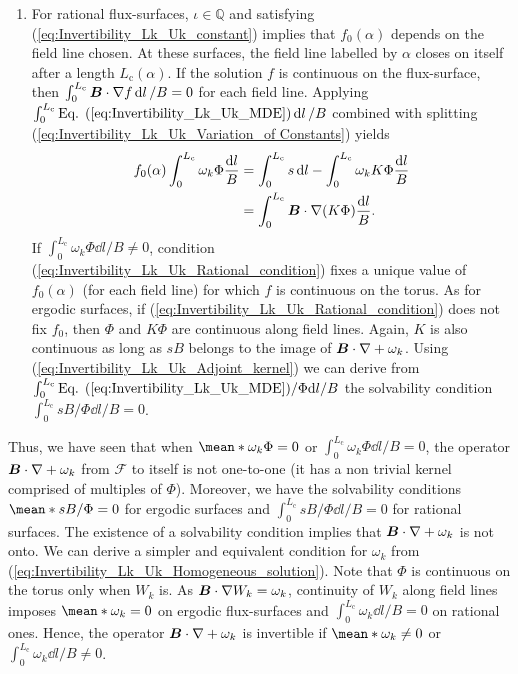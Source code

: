 \begin{enumerate}
    \item For rational flux-surfaces, $\iota\in \mathbb{Q}$ and satisfying (\ref{eq:Invertibility_Lk_Uk_constant}) implies that $f_0(\alpha)$ depends on the field line chosen. At these surfaces, the field line labelled by $\alpha$ closes on itself after a length $L_{\text{c}}(\alpha)$. If the solution $f$ is continuous on the flux-surface, then $\int_{0}^{L_{\text{c}}} \vb*{B}\cdot\nabla f \dd{l}/B=0$ for each field line. Applying $\int_{0}^{L_{\text{c}}} \text{Eq. (\ref{eq:Invertibility_Lk_Uk_MDE})}\dd{l}/B$ combined with splitting (\ref{eq:Invertibility_Lk_Uk_Variation_of Constants}) yields
    \begin{align}
    	f_0(\alpha)
    	\int_{0}^{L_{\text{c}}} \omega_k \Phi \frac{\dd{l}}{B}  
    	& =  
    	\int_{0}^{L_{\text{c}}} s \dd{l} - \int_{0}^{L_{\text{c}}} \omega_k K \Phi \frac{\dd{l}}{B}
    	\nonumber 
    	\\
    	& =  
        \int_{0}^{L_{\text{c}}} \vb*{B}\cdot\nabla(K \Phi) \frac{\dd{l}}{B}
    	. \label{eq:Invertibility_Lk_Uk_Rational_condition}
    \end{align}
    If $\int_{0}^{L_{\text{c}}} \omega_k \Phi {\dd{l}}/{B} \ne 0$, condition (\ref{eq:Invertibility_Lk_Uk_Rational_condition}) fixes a unique value of $f_0(\alpha)$ (for each field line) for which $f$ is continuous on the torus. As for ergodic surfaces, if (\ref{eq:Invertibility_Lk_Uk_Rational_condition}) does not fix $f_0$, then $\Phi$ and $K\Phi$ are continuous along field lines. Again, $K$ is also continuous as long as $sB$ belongs to the image of $\vb*{B}\cdot \nabla + \omega_k$. Using (\ref{eq:Invertibility_Lk_Uk_Adjoint_kernel}) we can derive from $\int_{0}^{L_{\text{c}}}\text{Eq. (\ref{eq:Invertibility_Lk_Uk_MDE})}/\Phi{\dd{l}}/{B}$ the solvability condition $\int_{0}^{L_{\text{c}}}sB/\Phi{\dd{l}}/{B}=0$.
\end{enumerate}

Thus, we have seen that when $\mean*{\omega_k \Phi}=0$ or $\int_{0}^{L_{\text{c}}} \omega_k \Phi {\dd{l}}/{B}=0$, the operator $\vb*{B}\cdot\nabla + \omega_k$ from $\mathcal{F}$ to itself is not one-to-one (it has a non trivial kernel comprised of multiples of $\Phi$).  
Moreover, we have the solvability conditions $\mean*{sB/\Phi}=0$ for ergodic surfaces and $\int_{0}^{L_\text{c}}sB/\Phi\dd{l}/B = 0$ for rational surfaces. The existence of a solvability condition implies that $\vb*{B}\cdot\nabla + \omega_k$ is not onto. We can derive a simpler and equivalent condition for $\omega_k$ from (\ref{eq:Invertibility_Lk_Uk_Homogeneous_solution}). Note that $\Phi$ is continuous on the torus only when $W_k$ is. As $\vb*{B}\cdot\nabla W_k = \omega_k$, continuity of $W_k$ along field lines imposes $\mean*{\omega_k}=0$ on ergodic flux-surfaces and $\int_{0}^{L_{\text{c}}} \omega_k  {\dd{l}}/{B} =0$ on rational ones. Hence, the operator $\vb*{B}\cdot\nabla + \omega_k$ is invertible if $\mean*{\omega_k} \ne 0 $ or $\int_{0}^{L_{\text{c}}} \omega_k {\dd{l}}/{B} \ne 0$. 

